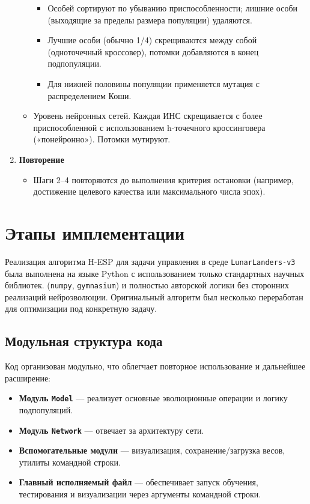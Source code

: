 \documentclass[a4paper,12pt]{article}
\begin{document}
\begin{enumerate}
\begin{itemize}
\begin{itemize}
		\item Особей сортируют по убыванию приспособленности; лишние особи (выходящие за пределы размера популяции) удаляются.
		\item Лучшие особи (обычно 1/4) скрещиваются между собой (одноточечный кроссовер), потомки добавляются в конец подпопуляции.
		\item Для нижней половины популяции применяется мутация с распределением Коши.
	\end{itemize}
    \item Уровень нейронных сетей. Каждая ИНС скрещивается с более приспособленной с использованием h-точечного кроссинговера («понейронно»). Потомки мутируют.
    \end{itemize}
	\item \textbf{Повторение}
	\begin{itemize}
		\item Шаги 2--4 повторяются до выполнения критерия остановки (например, достижение целевого качества или максимального числа эпох).
	\end{itemize}
	
    
    
\end{enumerate}


\newpage
\section{Этапы имплементации}

Реализация алгоритма H-ESP для задачи управления в среде \texttt{LunarLanders-v3} была выполнена на языке Python с использованием только стандартных научных библиотек. (\texttt{numpy}, \texttt{gymnasium}) и полностью авторской логики без сторонних реализаций нейроэволюции. Оригинальный алгоритм был несколько переработан для оптимизации под конкретную задачу.

\subsection{Модульная структура кода}

Код организован модульно, что облегчает повторное использование и дальнейшее расширение:
\begin{itemize}
	\item \textbf{Модуль \texttt{Model}} — реализует основные эволюционные операции и логику подпопуляций.
	\item \textbf{Модуль \texttt{Network}} — отвечает за архитектуру сети.
	\item \textbf{Вспомогательные модули} — визуализация, сохранение/загрузка весов, утилиты командной строки.
	\item \textbf{Главный исполняемый файл} — обеспечивает запуск обучения, тестирования и визуализации через аргументы командной строки.
\end{itemize}
\end{document}
